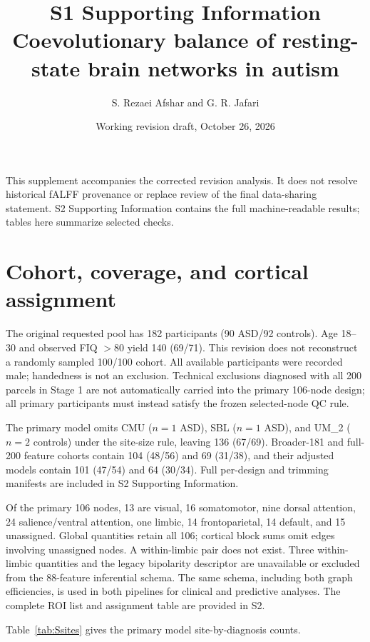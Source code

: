 \documentclass[10pt,letterpaper]{article}
\title{S1 Supporting Information\\Coevolutionary balance of resting-state brain networks in autism}
\author{S. Rezaei Afshar and G. R. Jafari}
\date{Working revision draft, October 26, 2026}
\begin{document}
\maketitle
\noindent This supplement accompanies the corrected revision analysis. It does not
resolve historical fALFF provenance or replace review of the final data-sharing
statement. S2 Supporting Information contains the full machine-readable
results; tables here summarize selected checks.
\renewcommand{\thetable}{S\arabic{table}}
\renewcommand{\thefigure}{S\arabic{figure}}

\section*{Cohort, coverage, and cortical assignment}
The original requested pool has 182 participants (90 ASD/92 controls). Age 18--30
and observed FIQ $>80$ yield 140 (69/71). This revision does not reconstruct a
randomly sampled 100/100 cohort. All available participants were recorded male;
handedness is not an exclusion. Technical exclusions diagnosed with all 200
parcels in Stage 1 are not automatically carried into the primary 106-node design;
all primary participants must instead satisfy the frozen selected-node QC rule.

The primary model omits CMU ($n=1$ ASD), SBL ($n=1$ ASD), and UM\_2 ($n=2$
controls) under the site-size rule, leaving 136 (67/69). Broader-181 and full-200
feature cohorts contain 104 (48/56) and 69 (31/38), and their adjusted models
contain 101 (47/54) and 64 (30/34). Full per-design and trimming manifests are
included in S2 Supporting Information.

Of the primary 106 nodes, 13 are visual, 16 somatomotor, nine dorsal attention,
24 salience/ventral attention, one limbic, 14 frontoparietal, 14 default, and 15
unassigned. Global quantities retain all 106; cortical block sums omit edges
involving unassigned nodes. A within-limbic pair does not exist. Three
within-limbic quantities and the legacy bipolarity descriptor are unavailable or
excluded from the 88-feature inferential schema. The same schema, including
both graph efficiencies, is used in both pipelines for clinical and predictive
analyses. The complete ROI list and assignment table are provided in S2.

Table~\ref{tab:Ssites} gives the primary model site-by-diagnosis counts.

\end{document}
